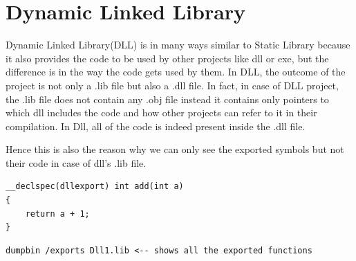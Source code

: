 \documentclass{article}
\begin{document}
\section{Dynamic Linked Library}
Dynamic Linked Library(DLL) is in many ways similar to Static Library because
it also provides the code to be used by other projects like dll or exe,
but the difference is in the way the code gets used by them.
In DLL, the outcome of the project is not only a .lib file but also a
.dll file. In fact, in case of DLL project, the .lib file does not contain
any .obj file instead it contains only pointers to which dll includes
the code and how other projects can refer to it in their compilation.
In Dll, all of the code is indeed present inside the .dll file.

Hence this is also the reason why we can only see the exported symbols
but not their code in case of dll's .lib file.

\begin{verbatim}
__declspec(dllexport) int add(int a)
{
    return a + 1;
}
\end{verbatim}

\begin{verbatim}
dumpbin /exports Dll1.lib <-- shows all the exported functions
\end{verbatim}
\end{document}
